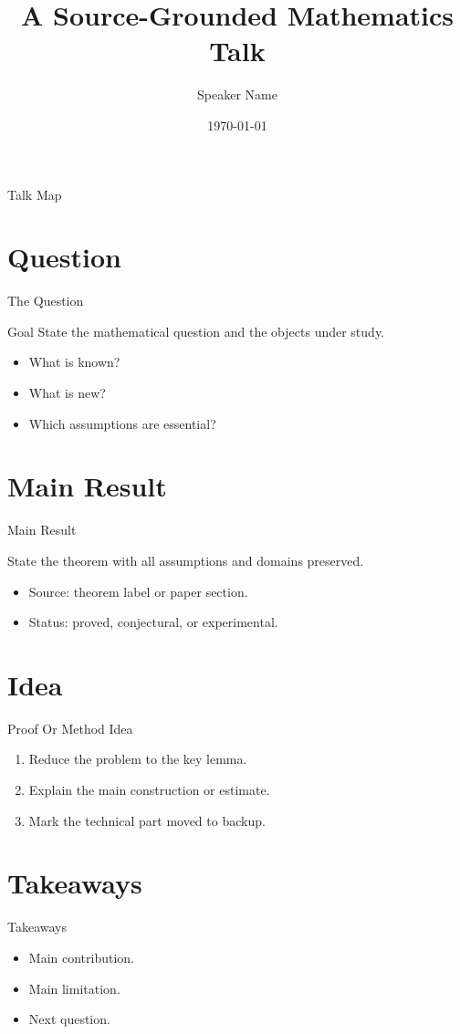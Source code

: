 \documentclass[10pt,aspectratio=169]{beamer}
\title{A Source-Grounded Mathematics Talk}
\author{Speaker Name}
\institute{Institution}
\date{\today}
\begin{document}
\begin{frame}
  \titlepage
\end{frame}

\begin{frame}{Talk Map}
  \tableofcontents
\end{frame}

\section{Question}
\begin{frame}{The Question}
  \begin{block}{Goal}
    State the mathematical question and the objects under study.
  \end{block}
  \begin{itemize}
    \item What is known?
    \item What is new?
    \item Which assumptions are essential?
  \end{itemize}
\end{frame}

\section{Main Result}
\begin{frame}{Main Result}
  \begin{theorem}
    State the theorem with all assumptions and domains preserved.
  \end{theorem}
  \begin{itemize}
    \item Source: theorem label or paper section.
    \item Status: proved, conjectural, or experimental.
  \end{itemize}
\end{frame}

\section{Idea}
\begin{frame}{Proof Or Method Idea}
  \begin{enumerate}
    \item Reduce the problem to the key lemma.
    \item Explain the main construction or estimate.
    \item Mark the technical part moved to backup.
  \end{enumerate}
\end{frame}

\section{Takeaways}
\begin{frame}{Takeaways}
  \begin{itemize}
    \item Main contribution.
    \item Main limitation.
    \item Next question.
  \end{itemize}
\end{frame}
\end{document}
